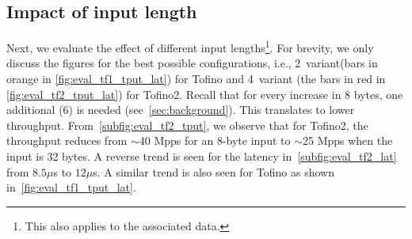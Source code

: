 
% 


\subsection{Impact of input length}
Next, we evaluate the effect of different input lengths\footnote{This also applies to the associated data.}.
For brevity, we only discuss the figures for the best possible configurations, i.e., 2~\pround variant(bars in orange in \cref{fig:eval_tf1_tput_lat}) for Tofino and 4~\pround variant (the bars in red in \cref{fig:eval_tf2_tput_lat}) for Tofino2.
Recall that for every increase in 8 bytes, one additional \perm(6) is needed (see~\cref{sec:background}).
This translates to lower throughput.
From~\cref{subfig:eval_tf2_tput}, we observe that for Tofino2, the throughput reduces from ${\sim}$40 Mpps for an 8-byte input %
to ${\sim}$25 Mpps when the input is 32 bytes.
A reverse trend is seen for the latency in~\cref{subfig:eval_tf2_lat} from $8.5 \mu$s to $12 \mu$s. 
A similar trend is also seen for Tofino as shown in~\cref{fig:eval_tf1_tput_lat}.

